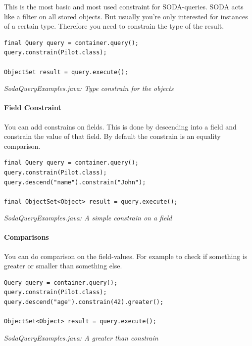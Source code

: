 This is the most basic and most used constraint for SODA-queries. SODA acts like a filter on all stored objects. But usually you're only interested for instances of a certain type. Therefore you need to constrain the type of the result.

\begin{lstlisting}
final Query query = container.query();
query.constrain(Pilot.class);

ObjectSet result = query.execute();
\end{lstlisting}

{\small\itshape SodaQueryExamples.java: Type constrain for the objects\par}
\medskip

\paragraph{Field Constraint}
\label{ref:basics-querying-soda-soda-example-catelog:fieldconstraint}

You can add constrains on fields. This is done by descending into a field and constrain the value of that field. By default the constrain is an equality comparison.

\begin{lstlisting}
final Query query = container.query();
query.constrain(Pilot.class);
query.descend("name").constrain("John");

final ObjectSet<Object> result = query.execute();
\end{lstlisting}

{\small\itshape SodaQueryExamples.java: A simple constrain on a field\par}
\medskip

\paragraph{Comparisons}
\label{ref:basics-querying-soda-soda-example-catelog:comparisons}

You can do comparison on the field-values. For example to check if something is greater or smaller than something else.

\begin{lstlisting}
Query query = container.query();
query.constrain(Pilot.class);
query.descend("age").constrain(42).greater();

ObjectSet<Object> result = query.execute();
\end{lstlisting}

{\small\itshape SodaQueryExamples.java: A greater than constrain\par}
\medskip

